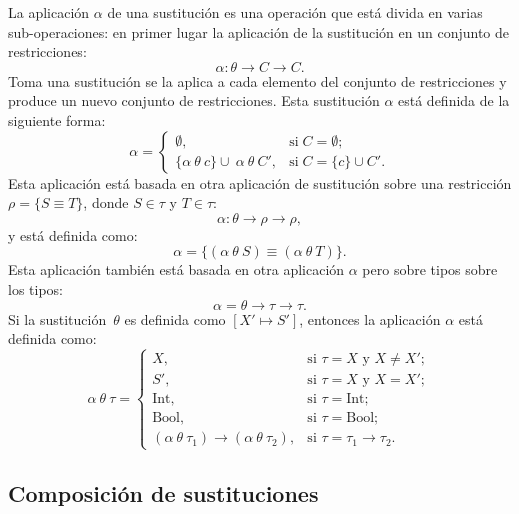 \documentclass{article}
\theoremstyle{definition}
\begin{document}
La aplicación $\alpha$ de una sustitución es una operación que está
divida en varias sub-operaciones: en primer lugar la aplicación de la
sustitución en un conjunto de restricciones:
\begin{equation*}
  \alpha : \theta \to C \to C.
\end{equation*}
Toma una sustitución se la aplica a cada elemento del conjunto de
restricciones y produce un nuevo conjunto de restricciones. Esta
sustitución $\alpha$ está definida de la siguiente forma:
\begin{equation*}
  \alpha =
  \begin{cases}
    \emptyset, & \text{si} \; C = \emptyset;
    \\
    \{\alpha\ \theta\ c\} \cup\ \alpha\ \theta\ C', & \text{si} \; C =
    \{c\} \cup C'.
  \end{cases}
\end{equation*}
Esta aplicación está basada en otra aplicación de sustitución sobre
una restricción $\rho = \{ S \equiv T \}$, donde $S \in \tau$ y $T \in
\tau$:
\begin{equation*}
  \alpha : \theta \to \rho \to \rho,
\end{equation*}
y está definida como:
\begin{equation*}
  \alpha = \{(\alpha\ \theta\ S) \equiv (\alpha\ \theta\ T)\}.
\end{equation*}
Esta aplicación también está basada en otra aplicación $\alpha$ pero
sobre tipos sobre los tipos:
\begin{equation*}
  \alpha = \theta \to \tau \to \tau.
\end{equation*}
Si la sustitución~$\theta$ es definida como $[ X' \mapsto S']$,
entonces la aplicación $\alpha$ está definida como:
\begin{equation*}
  \alpha\ \theta\ \tau =
  \begin{cases}
    X, & \text{si $\tau = X$ y $X \neq X'$};
    \\
    S', & \text{si $\tau = X$ y $X = X'$};
    \\
    \text{Int}, & \text{si $\tau = \text{Int}$};
    \\
    \text{Bool}, & \text{si $\tau = \text{Bool}$}
    ;\\
    (\alpha\ \theta\ \tau_1) \to (\alpha\ \theta\ \tau_2), & \text{si
      $\tau = \tau_1 \to \tau_2$}.
  \end{cases}
\end{equation*}

\subsection{Composición de sustituciones}
\label{sec:compsus}
\end{document}

